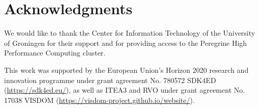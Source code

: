 \section*{Acknowledgments}
We would like to thank the Center for Information Technology of the University of Groningen for their support and for providing access to the Peregrine High Performance Computing cluster.

This work was supported by the European Union's Horizon 2020 research and innovation programme under grant agreement No. 780572 SDK4ED (\url{https://sdk4ed.eu/}), as well as ITEA3 and RVO under grant agreement No. 17038 VISDOM (\url{https://visdom-project.github.io/website/}).
